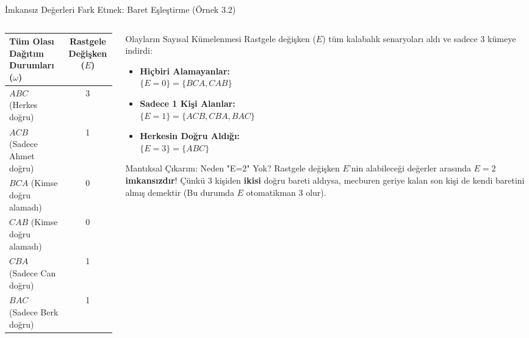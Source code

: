 ﻿\documentclass[light]{lutbeamer}
\begin{document}
\begin{frame}{İmkansız Değerleri Fark Etmek: Baret Eşleştirme (Örnek 3.2)}
\begin{columns}[T]
\begin{column}{0.54\textwidth}
    \centering
    \begin{tabular}{lc}
      \toprule
      Tüm Olası Dağıtım Durumları ($\omega$) & Rastgele Değişken ($E$) \\
      \midrule
      $ABC$ (Herkes doğru) & 3 \\
      $ACB$ (Sadece Ahmet doğru) & 1 \\
      $BCA$ (Kimse doğru alamadı) & 0 \\
      $CAB$ (Kimse doğru alamadı) & 0 \\
      $CBA$ (Sadece Can doğru) & 1 \\
      $BAC$ (Sadece Berk doğru) & 1 \\
      \bottomrule
    \end{tabular}
  \end{column}
  \vspace{-1cm}
  \begin{column}{0.44\textwidth}
    \begin{block}{Olayların Sayısal Kümelenmesi}
      Rastgele değişken ($E$) tüm kalabalık senaryoları aldı ve sadece 3 kümeye indirdi:
      \begin{itemize}
        \item \textbf{Hiçbiri Alamayanlar:} \\ $\{E=0\} = \{BCA, CAB\}$
        \item \textbf{Sadece 1 Kişi Alanlar:} \\ $\{E=1\} = \{ACB, CBA, BAC\}$
        \item \textbf{Herkesin Doğru Aldığı:} \\ $\{E=3\} = \{ABC\}$
      \end{itemize}
    \end{block}
    \begin{alertblock}{Mantıksal Çıkarım: Neden "E=2" Yok?}
      Rastgele değişken $E$'nin alabileceği değerler arasında $E=2$ \textbf{imkansızdır}! 
      Çünkü 3 kişiden \textbf{ikisi} doğru bareti aldıysa, mecburen geriye kalan son kişi de kendi baretini almış demektir (Bu durumda $E$ otomatikman 3 olur).
    \end{alertblock}
  \end{column}
\end{columns}
\end{frame}
\end{document}
